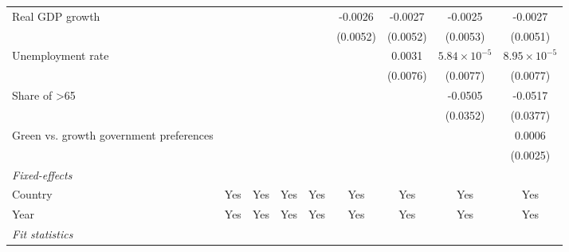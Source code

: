 \begin{table}[htbp]
\begin{tabular}{lcccccccc}
      Real GDP growth                                                       &          &          &                &                 & -0.0026         & -0.0027         & -0.0025               & -0.0027\\   
                                                                            &          &          &                &                 & (0.0052)        & (0.0052)        & (0.0053)              & (0.0051)\\   
      Unemployment rate                                                     &          &          &                &                 &                 & 0.0031          & $5.84\times 10^{-5}$  & $8.95\times 10^{-5}$\\    
                                                                            &          &          &                &                 &                 & (0.0076)        & (0.0077)              & (0.0077)\\   
      Share of >65                                                          &          &          &                &                 &                 &                 & -0.0505               & -0.0517\\   
                                                                            &          &          &                &                 &                 &                 & (0.0352)              & (0.0377)\\   
      Green vs. growth government preferences                               &          &          &                &                 &                 &                 &                       & 0.0006\\   
                                                                            &          &          &                &                 &                 &                 &                       & (0.0025)\\   
      \midrule
      \emph{Fixed-effects}\\
      Country                                                               & Yes      & Yes      & Yes            & Yes             & Yes             & Yes             & Yes                   & Yes\\  
      Year                                                                  & Yes      & Yes      & Yes            & Yes             & Yes             & Yes             & Yes                   & Yes\\  
      \midrule
      \emph{Fit statistics}\\

\end{tabular}
\end{table}
